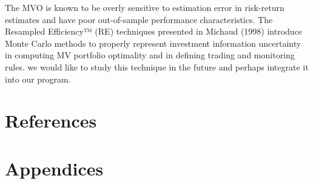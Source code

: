 \documentclass[12pt]{article}
\begin{document}
The MVO is known to be overly sensitive to estimation error in risk-return estimates and have poor out-of-sample performance characteristics. The Resampled Efficiency™ (RE) techniques presented in Michaud (1998) introduce Monte Carlo methods to properly represent investment information uncertainty in computing MV portfolio optimality and in defining trading and monitoring rules.  we would like to study this technique in the future and perhaps integrate it into our program.\\

\section{References}

\section{Appendices}
\end{document}
